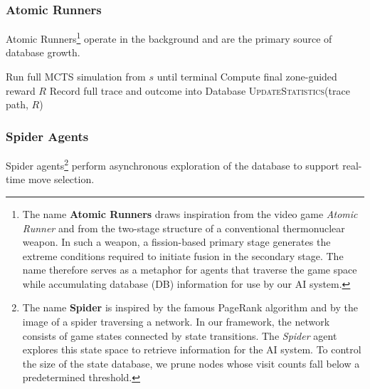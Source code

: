 \documentclass[11pt,a4paper]{article}
\theoremstyle{plain}
\theoremstyle{definition}
\begin{document}
\vspace{0.5em}

\subsubsection{Atomic Runners}

\vspace{0.5em}

Atomic Runners\footnote{The name \textbf{Atomic Runners} draws inspiration from the video game \textit{Atomic Runner} and from the two-stage structure of a conventional thermonuclear weapon. In such a weapon, a fission-based primary stage generates the extreme conditions required to initiate fusion in the secondary stage. The name therefore serves as a metaphor for agents that traverse the game space while accumulating database (DB) information for use by our AI system.} operate in the background and are the primary source of database growth.

\vspace{0.5em}

\begin{algorithm}[H]
\caption{Atomic Runner (Background Agent)}
\label{alg:atomic_runner}
\begin{algorithmic}[1]
        \State Run full MCTS simulation from $s$ until terminal
        \State Compute final zone-guided reward $R$
        \State Record full trace and outcome into Database
        \State \textsc{UpdateStatistics}(trace path, $R$)
    \EndWhile
\EndProcedure
\end{algorithmic}
\end{algorithm}

\vspace{0.5em}

\subsubsection{Spider Agents}

\vspace{0.5em}

Spider agents\footnote{The name \textbf{Spider} is inspired by the famous PageRank algorithm and by the image of a spider traversing a network. In our framework, the network consists of game states connected by state transitions. The \textit{Spider} agent explores this state space to retrieve information for the AI system. To control the size of the state database, we prune nodes whose visit counts fall below a predetermined threshold.} perform asynchronous exploration of the database to support real-time move selection.
\end{document}
